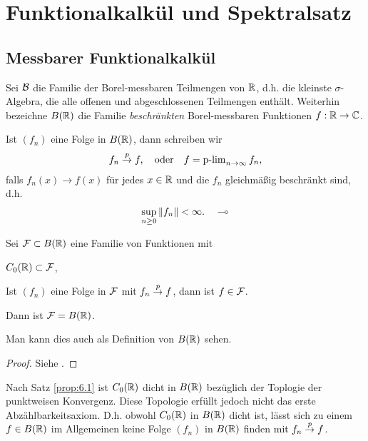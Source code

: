 \chapter{Funktionalkalkül und Spektralsatz}

\section{Messbarer Funktionalkalkül}

Sei $\mathcal{B}$ die Familie der Borel-messbaren Teilmengen von $\mathbb{R}$, d.h. die kleinste
$\sigma$-Algebra, die alle offenen und abgeschlossenen Teilmengen enthält.
Weiterhin bezeichne $B(\mathbb{R})$ die Familie \textit{beschränkten} Borel-messbaren
Funktionen $f: \mathbb{R}\to\mathbb{C}$.

\begin{bem*}[Notation.]
Ist $(f_n)$ eine Folge in $B(\mathbb{R})$, dann schreiben wir
\begin{align*}
f_n\overset{p}{\to} f,\quad \text{oder}\quad f = \operatorname{p-lim}\limits_{n\to\infty} f_n,
\end{align*}
falls $f_n(x)\to f(x)$ für jedes $x\in \mathbb{R}$ und die $f_n$ gleichmäßig beschränkt
sind, d.h.
\begin{align*}
\sup_{n\ge 0} \left\|f_n\right\| < \infty.\quad\multimap
\end{align*} 
\end{bem*}

\begin{prop}
\label{prop:6.1}
Sei $\mathcal{F}\subset B(\mathbb{R})$ eine Familie von Funktionen mit
\begin{propenum}
\item $C_0(\mathbb{R}) \subset \mathcal{F}$,
\item Ist $(f_n)$ eine Folge in $\mathcal{F}$ mit $f_n\overset{p}{\to} f$, dann ist $f\in\mathcal{F}$.
\end{propenum}
Dann ist $\mathcal{F}=B(\mathbb{R})$.\fishhere
\end{prop}

Man kann dies auch als Definition von $B(\mathbb{R})$ sehen.

\begin{proof}
Siehe \cite{Wer07}.\qedhere
\end{proof}

\begin{bem*}
Nach Satz \ref{prop:6.1} ist $C_0(\mathbb{R})$ dicht in $B(\mathbb{R})$ bezüglich der Toplogie
der punktweisen Konvergenz. Diese Topologie erfüllt jedoch nicht das erste
Abzählbarkeitsaxiom. D.h. obwohl $C_0(\mathbb{R})$ in $B(\mathbb{R})$ dicht ist, lässt sich zu
einem $f\in B(\mathbb{R})$ im Allgemeinen keine Folge $(f_n)$ in $B(\mathbb{R})$ finden mit
$f_n\overset{p}{\to} f$.\maphere
\end{bem*}

